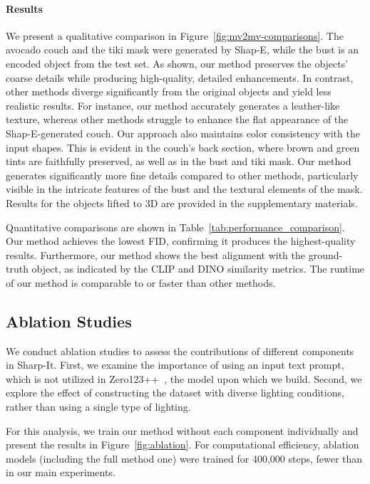 \paragraph{Results}
We present a qualitative comparison in Figure~\ref{fig:mv2mv-comparisons}. The avocado couch and the tiki mask were generated by Shap-E, while the bust is an encoded object from the test set. As shown, our method preserves the objects' coarse details while producing high-quality, detailed enhancements. In contrast, other methods diverge significantly from the original objects and yield less realistic results. For instance, our method accurately generates a leather-like texture, whereas other methods struggle to enhance the flat appearance of the Shap-E-generated couch.
Our approach also maintains color consistency with the input shapes. This is evident in the couch's back section, where brown and green tints are faithfully preserved, as well as in the bust and tiki mask. Our method generates significantly more fine details compared to other methods, particularly visible in the intricate features of the bust and the textural elements of the mask. 
Results for the objects lifted to 3D are provided in the supplementary materials.

Quantitative comparisons are shown in Table~\ref{tab:performance_comparison}. Our method achieves the lowest FID, confirming it produces the highest-quality results. Furthermore, our method shows the best alignment with the ground-truth object, as indicated by the CLIP and DINO similarity metrics. The runtime of our method is comparable to or faster than other methods.

\subsection{Ablation Studies}%


We conduct ablation studies to assess the contributions of different components in Sharp-It. 
First, we examine the importance of using an input text prompt, which is not utilized in Zero123++~\cite{shi2023zero123singleimageconsistent, xu2024instantmesh}, the model upon which we build.
Second, we explore the effect of constructing the dataset with diverse lighting conditions, rather than using a single type of lighting.

For this analysis, we train our method without each component individually and present the results in Figure~\ref{fig:ablation}.
For computational efficiency, ablation models (including the full method one) were trained for 400,000 steps, fewer than in our main experiments.


